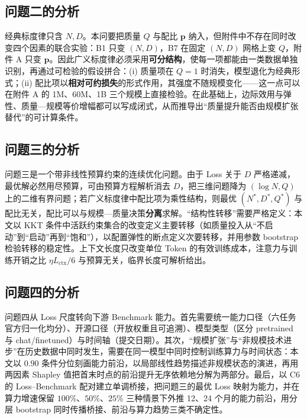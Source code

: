 \subsection{问题二的分析}

经典标度律只含 $N,D$。本问要把质量 $Q$ 与配比 $\boldsymbol p$ 纳入，但附件中不存在同时改变四个因素的联合实验：B1 只变 $(N,D)$，B7 在固定 $(N,D)$ 网格上变 $Q$，附件 A 只变 $\boldsymbol p$。因此广义标度律必须采用\textbf{可分结构}，使每一项都能由一类数据单独识别，再通过可检验的假设拼合：(i) 质量项在 $Q=1$ 时消失，模型退化为经典形式；(ii) 配比项以\textbf{相对可约损失}的形式作用，其强度不随规模变化——这一点可以在附件 A 的 1M、60M、1B 三个规模上直接检验。在此基础上，边际效用与弹性、质量—规模等价增幅都可以写成闭式，从而推导出“质量提升能否由规模扩张替代”的可计算条件。

\subsection{问题三的分析}

问题三是一个带非线性预算约束的连续优化问题。由于 Loss 关于 $D$ 严格递减，最优解必然用尽预算，可由预算方程解析消去 $D$，把三维问题降为 $(\log N,Q)$ 上的二维有界问题；若广义标度律中配比项为乘性结构，则最优 $(N^*,D^*,Q^*)$ 与配比无关，配比可以与规模—质量决策\textbf{分离}求解。“结构性转移”需要严格定义：本文以 KKT 条件中活跃约束集合的改变定义主要转移（如质量投入从“不启动”到“启动”再到“饱和”），以配置弹性的断点定义次要转移，并用参数 bootstrap 检验转移的稳定性。上下文长度只改变单位 Token 的有效训练成本，注意力与训练开销之比 $\eta L_{\mathrm{ctx}}/6$ 与预算无关，临界长度可解析给出。

\subsection{问题四的分析}

问题四从 Loss 尺度转向下游 Benchmark 能力。首先需要统一能力口径（六任务官方归一化均分）、开源口径（开放权重且可追溯）、模型类型（区分 pretrained 与 chat/finetuned）与时间轴（提交日期）。其次，“规模扩张”与“非规模技术进步”在历史数据中同时发生，需要在同一模型中同时控制训练算力与时间状态：本文以 $0.90$ 条件分位刻画能力前沿，以局部线性趋势描述非规模状态的演进，再用两因素 Shapley 值把首末时点的前沿提升无序依赖地分解为两部分。最后，以 C6 的 Loss--Benchmark 配对建立单调桥接，把问题三的最优 Loss 映射为能力，并在算力增速保留 $100\%$、$50\%$、$25\%$ 三种情景下外推 12、24 个月的能力前沿，用分层 bootstrap 同时传播桥接、前沿与算力趋势三类不确定性。
